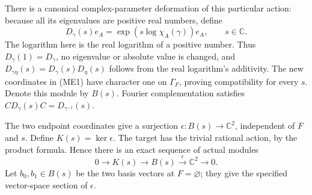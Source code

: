 \documentclass[11pt,a4paper]{article}
\theoremstyle{definition}\newtheorem{definition}[theorem]{Definition}
\newcommand{\C}{\mathbb C}\newcommand{\R}{\mathbb R}
\begin{document}
There is a canonical complex-parameter deformation of this particular
action: because all its eigenvalues are positive real numbers, define
\[
 D_\gamma(s)e_A=\exp(s\log\chi_A(\gamma))e_A,
 \qquad s\in\C.
 \tag{ME2}
\]
The logarithm here is the real logarithm of a positive number. Thus
$D_\gamma(1)=D_\gamma$, no eigenvalue or absolute value is changed, and
$D_{\gamma\eta}(s)=D_\gamma(s)D_\eta(s)$ follows from the real logarithm's
additivity. The new coordinates in (ME1) have character one on
$\Gamma_F$, proving compatibility for every $s$. Denote this module by
$B(s)$. Fourier complementation satisfies
$CD_\gamma(s)C=D_{\gamma^{-1}}(s)$.

The two endpoint coordinates give a surjection
$\epsilon:B(s)\to\C^2$, independent of $F$ and $s$. Define
$K(s)=\ker\epsilon$. The target has the trivial rational action, by the
product formula. Hence there is an exact sequence of actual modules
\[
 0\longrightarrow K(s)\longrightarrow B(s)
 \xrightarrow{\epsilon}\C^2\longrightarrow0.
 \tag{ME3}\label{eq:ME-extension}
\]
Let $b_0,b_1\in B(s)$ be the two basis vectors at $F=\varnothing$;
they give the specified vector-space section of $\epsilon$.
\end{document}
